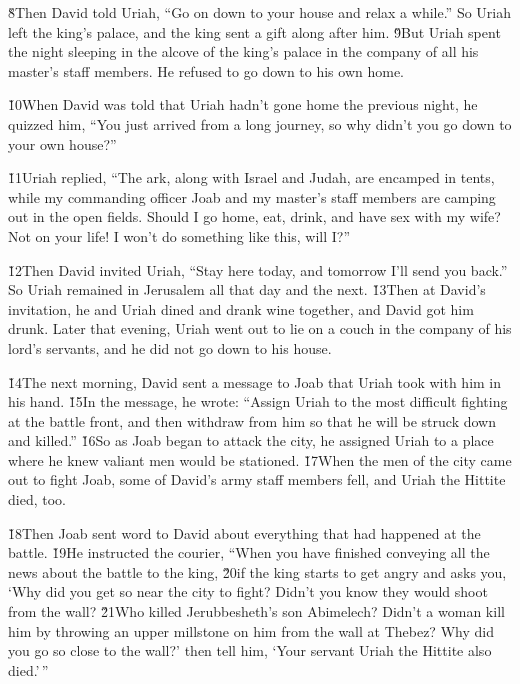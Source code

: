 \v{8}Then David told Uriah, ``Go on down to your house and relax a while.'' So Uriah left the king's palace, and the king sent a gift along after him. \v{9}But Uriah spent the night sleeping in the alcove of the king's palace in the company of all his master's staff members. He refused to go down to his own home.

\v{10}When David was told that Uriah hadn't gone home the previous night, he quizzed him, ``You just arrived from a long journey, so why didn't you go down to your own house?''

\v{11}Uriah replied, ``The ark, along with Israel and Judah, are encamped in tents, while my commanding officer Joab and my master's staff members are camping out in the open fields. Should I go home, eat, drink, and have sex with my wife? Not on your life! I won't do something like this, will I?''

\v{12}Then David invited Uriah, ``Stay here today, and tomorrow I'll send you back.'' So Uriah remained in Jerusalem all that day and the next. \v{13}Then at David's invitation, he and Uriah dined and drank wine together, and David got him drunk. Later that evening, Uriah went out to lie on a couch in the company of his lord's servants, and he did not go down to his house.

\v{14}The next morning, David sent a message to Joab that Uriah took with him in his hand. \v{15}In the message, he wrote: ``Assign Uriah to the most difficult fighting at the battle front, and then withdraw from him so that he will be struck down and killed.'' \v{16}So as Joab began to attack the city, he assigned Uriah to a place where he knew valiant men would be stationed. \v{17}When the men of the city came out to fight Joab, some of David's army staff members fell, and Uriah the Hittite died, too.

\v{18}Then Joab sent word to David about everything that had happened at the battle. \v{19}He instructed the courier, ``When you have finished conveying all the news about the battle to the king, \v{20}if the king starts to get angry and asks you, `Why did you get so near the city to fight? Didn't you know they would shoot from the wall? \v{21}Who killed Jerubbesheth's son Abimelech? Didn't a woman kill him by throwing an upper millstone on him from the wall at Thebez? Why did you go so close to the wall?' then tell him, `Your servant Uriah the Hittite also died.'\,''

